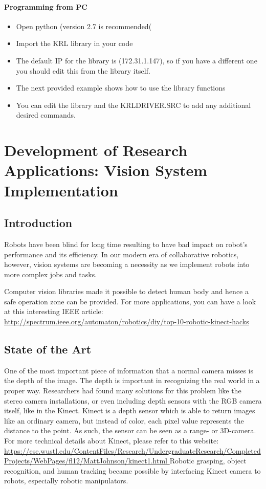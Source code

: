 \paragraph{Programming from PC }
\begin{itemize}
	\item Open python (version 2.7 is recommended(
	\item Import the KRL library in your code 
	\item The default IP for the library is (172.31.1.147), so if you have a different one you should edit this from the library itself. 
	\item The next provided example shows how to use the library functions 
	\item You can edit the library and the KRLDRIVER.SRC to add any additional desired commands.
\end{itemize}
\newpage
\section{Development of Research Applications: Vision System Implementation}
\subsection{Introduction}
Robots have been blind for long time resulting to have bad impact on robot's performance and its efficiency. In our modern era of collaborative robotics, however, vision systems are becoming a necessity as we implement robots into more complex jobs and tasks.


Computer vision libraries made it possible to detect human body and hence a safe operation zone can be provided. For more applications, you can have a look at this interesting IEEE article:
\url{http://spectrum.ieee.org/automaton/robotics/diy/top-10-robotic-kinect-hacks} 

\subsection{State of the Art}

One of the most important piece of information that a normal camera misses is the depth of the image. The depth is important in recognizing the real world in a proper way. Researchers had found many solutions for this problem like the stereo camera installations, or even including depth sensors with the RGB camera itself, like in the Kinect.
Kinect is a depth sensor which is able to return images like an ordinary camera, but instead of color, each pixel value represents the distance to the point. As such, the sensor can be seen as a range- or 3D-camera. For more technical details about Kinect, please refer to this website:
\newline \url{ https://ese.wustl.edu/ContentFiles/Research/UndergraduateResearch/CompletedProjects/WebPages/fl12/MattJohnson/kinect1.html }
Robotic grasping, object recognition, and human tracking became possible by interfacing Kinect camera to robots, especially robotic manipulators.

